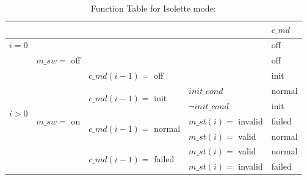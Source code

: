 \documentclass[fontsize=12pt,paper=letter,twoside]{scrartcl}
\begin{document}
\begin{table}[htb!]
\centering
\begin{tabular}{llll|l|}
\cline{5-5}
                                                        &                                                  &                                                           &                    & $c\_md$  \\ \hline
\multicolumn{4}{|l|}{$i = 0$}                                                                                                                                                                 & off    \\ \hline
\multicolumn{1}{|l|}{\multirow{8}{*}{$i > 0$}} & \multicolumn{3}{l|}{$m\_sw =$ off}                                                                                                  & off    \\ \cline{2-5}
\multicolumn{1}{|l|}{}                                  & \multicolumn{1}{l|}{\multirow{7}{*}{$m\_sw =$ on}} & \multicolumn{2}{l|}{$c\_md(i-1) =$ off}                                          & init   \\ \cline{3-5}
\multicolumn{1}{|l|}{}                                  & \multicolumn{1}{l|}{}                            & \multicolumn{1}{l|}{\multirow{2}{*}{$c\_md(i-1) =$ init}}   & $init\_cond$ \footnotemark        & normal \\ \cline{4-5}
\multicolumn{1}{|l|}{}                                  & \multicolumn{1}{l|}{}                            & \multicolumn{1}{l|}{}                                     & $\neg init\_cond$     & init   \\ \cline{3-5}
\multicolumn{1}{|l|}{}                                  & \multicolumn{1}{l|}{}                            & \multicolumn{1}{l|}{\multirow{2}{*}{$c\_md(i-1) =$ normal}} & $m\_st(i) =$ invalid & failed   \\ \cline{4-5}
\multicolumn{1}{|l|}{}                                  & \multicolumn{1}{l|}{}                            & \multicolumn{1}{l|}{}                                     & $m\_st(i) =$ valid   & normal \\ \cline{3-5}
\multicolumn{1}{|l|}{}                                  & \multicolumn{1}{l|}{}                            & \multicolumn{1}{l|}{\multirow{2}{*}{$c\_md(i-1) =$ failed}}   & $m\_st(i) =$ valid   & normal \\ \cline{4-5}
\multicolumn{1}{|l|}{}                                  & \multicolumn{1}{l|}{}                            & \multicolumn{1}{l|}{}                                     & $m\_st(i) =$ invalid & failed   \\ \hline
\end{tabular}
\caption{Function Table for Isolette mode: }
\end{table}
\end{document}
